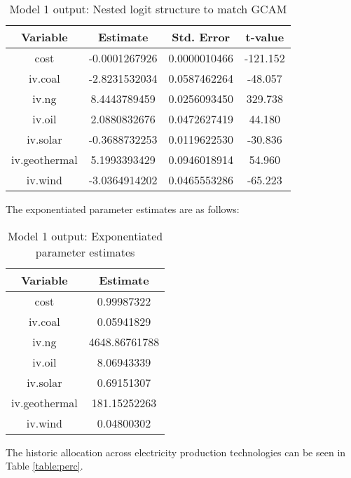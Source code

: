 \documentclass[10pt]{amsart}
\begin{document}
\begin{table}[H]
\caption{Model 1 output: Nested logit structure to match GCAM}
\centering
\begin{tabular}{c c c c}
\hline
\hline
Variable & Estimate & Std. Error & t-value \\ [0.5ex]
\hline
cost & -0.0001267926 & 0.0000010466 & -121.152 \\
iv.coal & -2.8231532034 & 0.0587462264 & -48.057 \\
iv.ng & 8.4443789459 & 0.0256093450 & 329.738 \\
iv.oil & 2.0880832676 & 0.0472627419 &  44.180 \\
iv.solar & -0.3688732253 & 0.0119622530 & -30.836 \\
iv.geothermal & 5.1993393429 & 0.0946018914 &  54.960 \\
iv.wind & -3.0364914202 & 0.0465553286 & -65.223 \\ [1ex]
\hline
\end{tabular}
\label{table:nl.1}
\end{table}

The exponentiated parameter estimates are as follows:
\begin{table}[H]
\caption{Model 1 output: Exponentiated parameter estimates}
\centering
\begin{tabular}{c c}
\hline
\hline
Variable & Estimate \\ [0.5ex]
\hline
cost & 0.99987322 \\
iv.coal & 0.05941829\\
iv.ng & 4648.86761788 \\
iv.oil & 8.06943339 \\
iv.solar & 0.69151307 \\
iv.geothermal & 181.15252263 \\
iv.wind & 0.04800302 \\ [1ex]
\hline
\end{tabular}
\label{table:nl.1}
\end{table}

The historic allocation across electricity production technologies can be seen in Table \ref{table:perc}.
\end{document}
